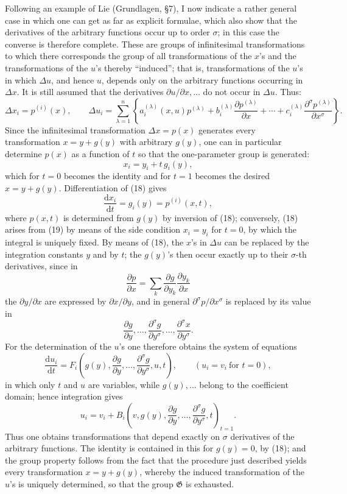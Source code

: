 \documentclass[11pt]{article}
\newcommand{\D}{\Delta}
\providecommand{\dd}{\mathrm d}
\providecommand{\G}{\mathfrak G}
\providecommand{\p}{\partial}
\providecommand{\p}{\partial}
\providecommand{\dd}{\mathrm d}
\begin{document}
Following an example of Lie (Grundlagen, \S{}7), I now indicate a rather general case in which one can get as far as explicit formulae, which also show that the derivatives of the arbitrary functions occur up to order \(\sigma\); in this case the converse is therefore complete. These are groups of infinitesimal transformations to which there corresponds the group of all transformations of the \(x\)'s and the transformations of the \(u\)'s thereby ``induced''; that is, transformations of the \(u\)'s in which \(\D u\), and hence \(u\), depends only on the arbitrary functions occurring in \(\D x\). It is still assumed that the derivatives \(\p u/\p x,\ldots\) do not occur in \(\D u\). Thus:
\[
\D x_i=p^{(i)}(x),\qquad
\D u_i=
\sum_{\lambda=1}^{n}\left\{
a_i^{(\lambda)}(x,u)p^{(\lambda)}
+b_i^{(\lambda)}\frac{\p p^{(\lambda)}}{\p x}
+\cdots+
c_i^{(\lambda)}\frac{\p^\sigma p^{(\lambda)}}{\p x^\sigma}
\right\}.
\]
Since the infinitesimal transformation \(\D x=p(x)\) generates every transformation \(x=y+g(y)\) with arbitrary \(g(y)\), one can in particular determine \(p(x)\) as a function of \(t\) so that the one-parameter group is generated:
\begin{equation}
x_i=y_i+t\,g_i(y),
\tag{18}
\end{equation}
which for \(t=0\) becomes the identity and for \(t=1\) becomes the desired \(x=y+g(y)\). Differentiation of (18) gives
\begin{equation}
\frac{\dd x_i}{\dd t}=g_i(y)=p^{(i)}(x,t),
\tag{19}
\end{equation}
where \(p(x,t)\) is determined from \(g(y)\) by inversion of (18); conversely, (18) arises from (19) by means of the side condition \(x_i=y_i\) for \(t=0\), by which the integral is uniquely fixed. By means of (18), the \(x\)'s in \(\D u\) can be replaced by the integration constants \(y\) and by \(t\); the \(g(y)\)'s then occur exactly up to their \(\sigma\)-th derivatives, since in
\[
\frac{\p p}{\p x}=\sum_k\frac{\p g}{\p y_k}\frac{\p y_k}{\p x}
\]
the \(\p y/\p x\) are expressed by \(\p x/\p y\), and in general \(\p^\sigma p/\p x^\sigma\) is replaced by its value in
\[
\frac{\p g}{\p y},\ldots,\frac{\p^\sigma g}{\p y^\sigma},\ldots,\frac{\p^\sigma x}{\p y^\sigma}.
\]
For the determination of the \(u\)'s one therefore obtains the system of equations
\[
\frac{\dd u_i}{\dd t}
=
F_i\!\left(g(y),\frac{\p g}{\p y},\ldots,\frac{\p^\sigma g}{\p y^\sigma},u,t\right),
\qquad (u_i=v_i\ \text{for }t=0),
\]
in which only \(t\) and \(u\) are variables, while \(g(y),\ldots\) belong to the coefficient domain; hence integration gives
\[
u_i=v_i+
B_i\!\left(v,g(y),\frac{\p g}{\p y},\ldots,\frac{\p^\sigma g}{\p y^\sigma},t\right)_{t=1}.
\]
Thus one obtains transformations that depend exactly on \(\sigma\) derivatives of the arbitrary functions. The identity is contained in this for \(g(y)=0\), by (18); and the group property follows from the fact that the procedure just described yields every transformation \(x=y+g(y)\), whereby the induced transformation of the \(u\)'s is uniquely determined, so that the group \(\G\) is exhausted.
\end{document}
